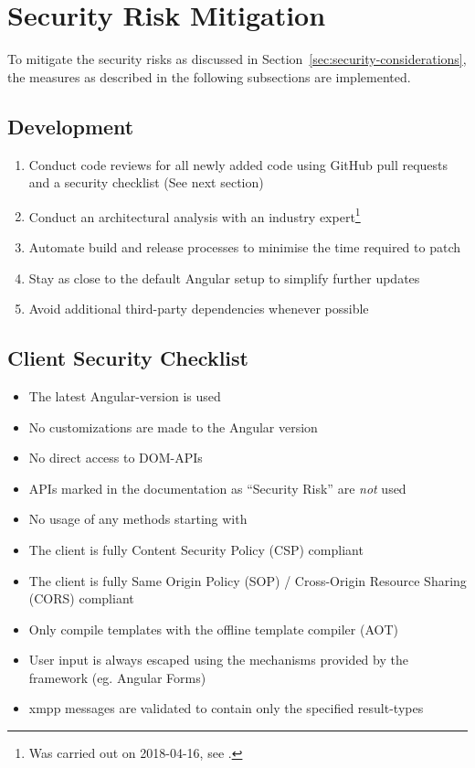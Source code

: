 \section{Security Risk Mitigation}\label{sec:security-risk-mitigation}

To mitigate the security risks as discussed in Section~\ref{sec:security-considerations}, the measures as described in the following subsections are implemented.

\subsection{Development}

\begin{enumerate}
    \item Conduct code reviews for all newly added code using GitHub pull requests and a security checklist (See next section)
    \item Conduct an architectural analysis with an industry expert\footnote{Was carried out on 2018-04-16, see .}
    \item Automate build and release processes to minimise the time required to patch
    \item Stay as close to the default Angular setup to simplify further updates
    \item Avoid additional third-party dependencies whenever possible
\end{enumerate}

\subsection{Client Security Checklist}
\begin{itemize}
    \item The latest Angular-version is used
    \item No customizations are made to the Angular version
    \item No direct access to DOM-APIs
    \item APIs marked in the documentation as ``Security Risk'' are \emph{not} used
    \item No usage of any methods starting with 
    \item The client is fully Content Security Policy (CSP) compliant
    \item The client is fully Same Origin Policy (SOP) / Cross-Origin Resource Sharing (CORS) compliant
    \item Only compile templates with the offline template compiler (AOT)
    \item User input is always escaped using the mechanisms provided by the framework (eg. Angular Forms)
    \item \gls{xmpp} messages are validated to contain only the specified result-types
\end{itemize}


